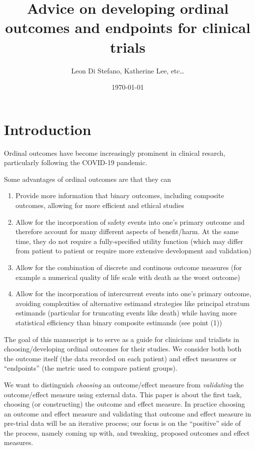 \documentclass[
  11pt,
  fleqn
]{article}
\title{Advice on developing ordinal outcomes and endpoints for clinical trials}
\author{Leon Di Stefano, Katherine Lee, etc\ldots}
\date{\today}
\begin{document}
\maketitle

\tableofcontents
\newpage

\section{Introduction}

Ordinal outcomes have become increasingly prominent in clinical
resarch, particularly following the COVID-19 pandemic.

Some advantages of ordinal outcomes are that they can
\begin{enumerate}
  \item Provide more information that binary outcomes, including
    composite outcomes, allowing for more efficient and ethical studies
  \item Allow for the incorporation of safety events into one's
    primary outcome and therefore account for many different aspects
    of benefit/harm. At the same time, they do not require a
    fully-specified utility function (which may differ from patient
    to patient or require more extensive development and validation)
  \item Allow for the combination of discrete and continous outcome
    measures (for example a numerical quality of life scale with
    death as the worst outcome)
  \item Allow for the incorporation of intercurrent events into one's
    primary outcome, avoiding complexities of alternative estimand strategies
    like principal stratum estimands (particular for truncating
    events like death) while having more statistical efficiency than
    binary composite estimands (see point (1))
\end{enumerate}

The goal of this manuscript is to serve as a guide for clinicians and trialists
in choosing/developing ordinal outcomes for their studies. We consider both
both the outcome itself (the data recorded on each patient) and effect
measures or ``endpoints'' (the metric used to compare patient groups).

We want to distinguish \emph{choosing} an outcome/effect measure from
\emph{validating} the outcome/effect measure using external data. This paper is
about the first task, choosing (or constructing) the outcome and effect
measure. In practice choosing an outcome and effect measure and validating that
outcome and effect measure in pre-trial data will be an iterative process; our
focus is on the ``positive'' side of the process, namely coming up
with, and tweaking, proposed outcomes and effect measures.
\end{document}
